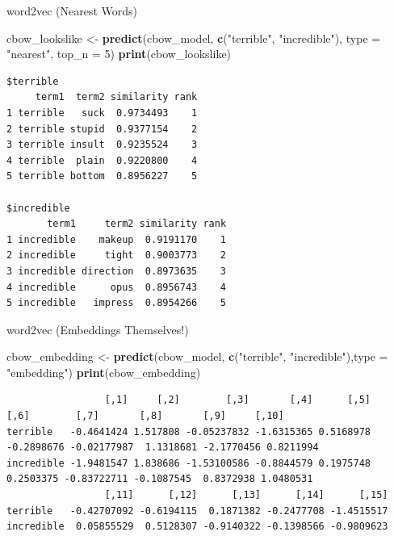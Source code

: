 \documentclass[
  ignorenonframetext,
  aspectratio=169]{beamer}
\newenvironment{Shaded}{\begin{snugshade}}{\end{snugshade}}
\newcommand{\AttributeTok}[1]{\textcolor[rgb]{0.13,0.29,0.53}{#1}}
\newcommand{\DecValTok}[1]{\textcolor[rgb]{0.00,0.00,0.81}{#1}}
\newcommand{\FunctionTok}[1]{\textcolor[rgb]{0.13,0.29,0.53}{\textbf{#1}}}
\newcommand{\NormalTok}[1]{#1}
\newcommand{\OtherTok}[1]{\textcolor[rgb]{0.56,0.35,0.01}{#1}}
\newcommand{\StringTok}[1]{\textcolor[rgb]{0.31,0.60,0.02}{#1}}
\begin{document}
\begin{frame}[fragile]{word2vec (Nearest Words)}
\label{word2vec-nearest-words}
\scriptsize

\begin{Shaded}
\begin{Highlighting}[]
\NormalTok{cbow\_lookslike }\OtherTok{\textless{}{-}} \FunctionTok{predict}\NormalTok{(cbow\_model, }\FunctionTok{c}\NormalTok{(}\StringTok{"terrible"}\NormalTok{, }\StringTok{"incredible"}\NormalTok{), }\AttributeTok{type =} \StringTok{"nearest"}\NormalTok{, }\AttributeTok{top\_n =} \DecValTok{5}\NormalTok{)}
\FunctionTok{print}\NormalTok{(cbow\_lookslike)}
\end{Highlighting}
\end{Shaded}

\begin{verbatim}
$terrible
     term1  term2 similarity rank
1 terrible   suck  0.9734493    1
2 terrible stupid  0.9377154    2
3 terrible insult  0.9235524    3
4 terrible  plain  0.9220800    4
5 terrible bottom  0.8956227    5

$incredible
       term1     term2 similarity rank
1 incredible    makeup  0.9191170    1
2 incredible     tight  0.9003773    2
3 incredible direction  0.8973635    3
4 incredible      opus  0.8956743    4
5 incredible   impress  0.8954266    5
\end{verbatim}
\end{frame}

\begin{frame}[fragile]{word2vec (Embeddings Themselves!)}
\label{word2vec-embeddings-themselves}
\scriptsize

\begin{Shaded}
\begin{Highlighting}[]
\NormalTok{cbow\_embedding }\OtherTok{\textless{}{-}} \FunctionTok{predict}\NormalTok{(cbow\_model, }\FunctionTok{c}\NormalTok{(}\StringTok{"terrible"}\NormalTok{, }\StringTok{"incredible"}\NormalTok{),}\AttributeTok{type =} \StringTok{"embedding"}\NormalTok{)}
\FunctionTok{print}\NormalTok{(cbow\_embedding)}
\end{Highlighting}
\end{Shaded}

\begin{verbatim}
                 [,1]     [,2]        [,3]       [,4]      [,5]       [,6]        [,7]       [,8]       [,9]     [,10]
terrible   -0.4641424 1.517808 -0.05237832 -1.6315365 0.5168978 -0.2898676 -0.02177987  1.1318681 -2.1770456 0.8211994
incredible -1.9481547 1.838686 -1.53100586 -0.8844579 0.1975748  0.2503375 -0.83722711 -0.1087545  0.8372938 1.0480531
                 [,11]      [,12]      [,13]      [,14]      [,15]
terrible   -0.42707092 -0.6194115  0.1871382 -0.2477708 -1.4515517
incredible  0.05855529  0.5128307 -0.9140322 -0.1398566 -0.9809623
\end{verbatim}
\end{frame}
\end{document}
